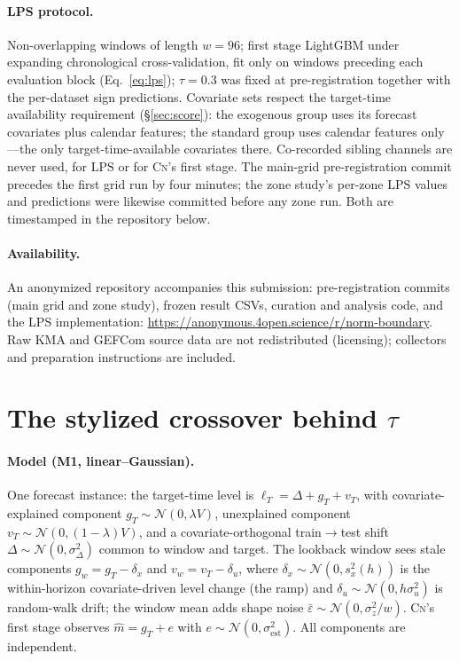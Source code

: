 \documentclass{article}
\newcommand{\lps}{\ensuremath{\mathrm{LPS}}}
\newcommand{\cnm}{\textsc{Cn}}
\begin{document}
\paragraph{LPS protocol.} Non-overlapping windows of length $w=96$; first stage
LightGBM under expanding chronological cross-validation, fit only on windows
preceding each evaluation block (Eq.~\ref{eq:lps}); $\tau=0.3$ was fixed at
pre-registration together with the per-dataset sign predictions. Covariate
sets respect the target-time availability requirement (\S\ref{sec:score}):
the exogenous group uses its forecast covariates plus calendar features; the
standard group uses calendar features only---the only target-time-available
covariates there. Co-recorded sibling channels are never used, for \lps{} or
for \cnm's first stage. The main-grid
pre-registration commit precedes the first grid run by four minutes; the zone
study's per-zone \lps{} values and predictions were likewise committed before any
zone run. Both are timestamped in the repository below.

\paragraph{Availability.} An anonymized repository accompanies this submission:
pre-registration commits (main grid and zone study), frozen result CSVs, curation
and analysis code, and the LPS implementation:
\url{https://anonymous.4open.science/r/norm-boundary}. Raw KMA and GEFCom source
data are not redistributed (licensing); collectors and preparation instructions
are included.

\section{The stylized crossover behind $\tau$}\label{app:theory}

\paragraph{Model (M1, linear--Gaussian).} One forecast instance: the target-time
level is $\ell_T = \Delta + g_T + v_T$, with covariate-explained component
$g_T \sim \mathcal N(0, \lambda V)$, unexplained component
$v_T \sim \mathcal N(0, (1-\lambda)V)$, and a covariate-orthogonal
train$\to$test shift $\Delta \sim \mathcal N(0, \sigma_\Delta^2)$ common to
window and target. The lookback window sees stale components
$g_w = g_T - \delta_x$ and $v_w = v_T - \delta_u$, where
$\delta_x \sim \mathcal N(0, s_x^2(h))$ is the within-horizon covariate-driven
level change (the ramp) and $\delta_u \sim \mathcal N(0, h\sigma_u^2)$ is
random-walk drift; the window mean adds shape noise
$\bar\varepsilon \sim \mathcal N(0, \sigma_z^2/w)$. \cnm's first stage observes
$\hat m = g_T + e$ with $e \sim \mathcal N(0, \sigma_{\mathrm{est}}^2)$. All
components are independent.
\end{document}
